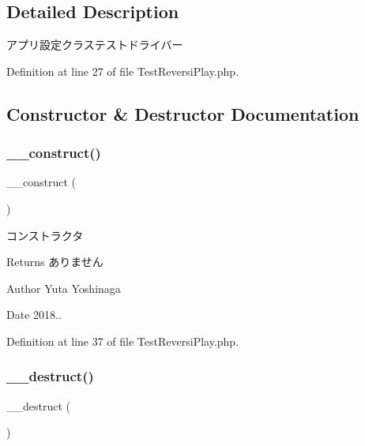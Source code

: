 \subsection{Detailed Description}
アプリ設定クラステストドライバー 

Definition at line 27 of file Test\+Reversi\+Play.\+php.



\subsection{Constructor \& Destructor Documentation}
\mbox{\label{class_test_reversi_play_a095c5d389db211932136b53f25f39685}} 
\subsubsection{\texorpdfstring{\+\_\+\+\_\+construct()}{\_\_construct()}}
{\footnotesize\ttfamily \+\_\+\+\_\+construct (\begin{DoxyParamCaption}{ }\end{DoxyParamCaption})}



コンストラクタ 

\begin{DoxyReturn}{Returns}
ありません 
\end{DoxyReturn}
\begin{DoxyAuthor}{Author}
Yuta Yoshinaga 
\end{DoxyAuthor}
\begin{DoxyDate}{Date}
2018.. 
\end{DoxyDate}


Definition at line 37 of file Test\+Reversi\+Play.\+php.

\mbox{\label{class_test_reversi_play_a421831a265621325e1fdd19aace0c758}} 
\subsubsection{\texorpdfstring{\+\_\+\+\_\+destruct()}{\_\_destruct()}}
{\footnotesize\ttfamily \+\_\+\+\_\+destruct (\begin{DoxyParamCaption}{ }\end{DoxyParamCaption})}




